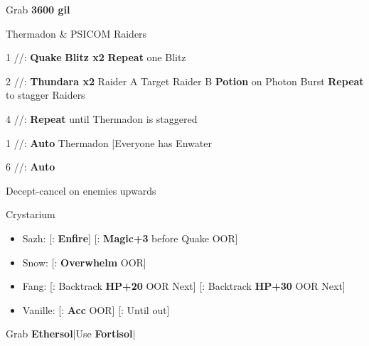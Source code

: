 \begin{mainlist}
	\item Grab \textbf{3600 gil}
\end{mainlist}
\begin{fight}{Thermadon \& PSICOM Raiders}
	\item [1] \com/\syn/\com: \textbf{Quake} \to \textbf{Blitz x2} \to \textbf{Repeat} one Blitz
	\item [2] \rav/\rav/\rav: \textbf{Thundara x2} Raider A \to Target Raider B \to \textbf{Potion} on Photon Burst \to \textbf{Repeat} to stagger Raiders
	\item [4] \rav/\rav/\rav: \textbf{Repeat} until Thermadon is staggered
	\item [1] \com/\syn/\com: \textbf{Auto} Thermadon |Everyone has Enwater
	\item [6] \com/\com/\com: \textbf{Auto}
\end{fight}
\begin{mainlist}
	\item Decept-cancel on enemies upwards
\end{mainlist}
\begin{menu}
	\item Crystarium
	\begin{itemize}
		\item Sazh: [\syn: \textbf{Enfire}] [\com: \textbf{Magic+3} before Quake OOR]
		\item Snow: [\rav: \textbf{Overwhelm} OOR]
		\item Fang: [\com: Backtrack \textbf{HP+20} OOR \to Next] [\sab: Backtrack \textbf{HP+30} OOR \to Next]
		\item Vanille: [\sab: \textbf{Acc} OOR] [\med: Until out]
	\end{itemize}
\end{menu}
\begin{mainlist}
	\item Grab \textbf{Ethersol}|Use \textbf{Fortisol}|\skip
\end{mainlist}
